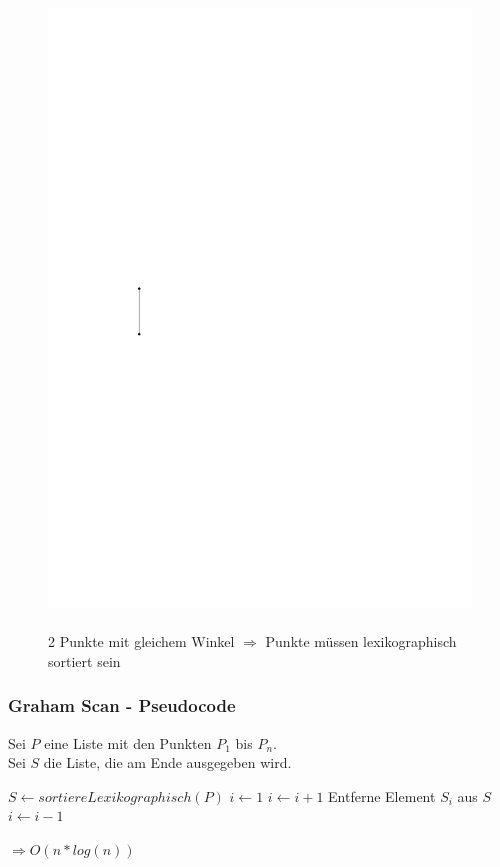 \begin{frame}
\begin{figure}[htbp]
\begin{minipage}[b]{.4\linewidth}
    \includegraphics[width=\linewidth]{bilder/sonderfall2}
    \\
    \\
    \tiny{2 Punkte mit gleichem Winkel $\Rightarrow$ Punkte müssen lexikographisch sortiert sein}
    \end{minipage}
\end{figure}


\end{frame}


\begin{frame}
	\frametitle{{Graham Scan - Pseudocode}}
	Sei $P$ eine Liste mit den Punkten $P_1$ bis $P_n$.\\
	Sei $S$ die Liste, die am Ende ausgegeben wird.
	\pause
	\begin{algorithmic}
	\State $S \gets sortiereLexikographisch(P)$
	\State $i \gets 1$
	\pause
		\State $i \gets i + 1$
		\pause
		\Else 
		\State Entferne Element $S_i$ aus $S$
		\State $i \gets i - 1$
		\EndIf
	\EndWhile
	\end{algorithmic}
	$\Rightarrow O(n*log(n))$
\end{frame}


